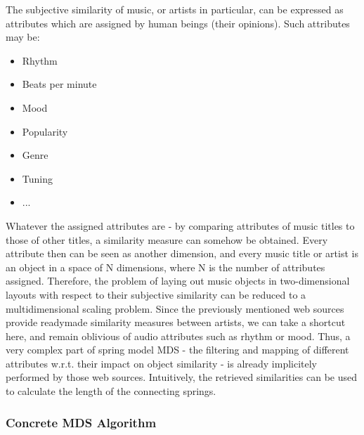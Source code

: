 The subjective similarity of music, or artists in particular, can be expressed as attributes which are assigned by human beings (their opinions). Such attributes may be:

\begin{itemize}
	\item Rhythm
	\item Beats per minute
	\item Mood
	\item Popularity
	\item Genre
	\item Tuning
	\item ...
\end{itemize}

Whatever the assigned attributes are - by comparing attributes of music titles to those of other titles, a similarity measure can somehow be obtained. Every attribute then can be seen as another dimension, and every music title or artist is an object in a space of N dimensions, where N is the number of attributes assigned.
Therefore, the problem of laying out music objects in two-dimensional layouts with respect to their subjective similarity can be reduced to a multidimensional scaling problem.
Since the previously mentioned web sources provide readymade similarity measures between artists, we can take a shortcut here, and remain oblivious of audio attributes such as rhythm or mood. Thus, a very complex part of spring model MDS - the filtering and mapping of different attributes w.r.t. their impact on object similarity - is already implicitely performed by those web sources. Intuitively, the retrieved similarities can be used to calculate the length of the connecting springs.

\subsubsection{Concrete MDS Algorithm}

